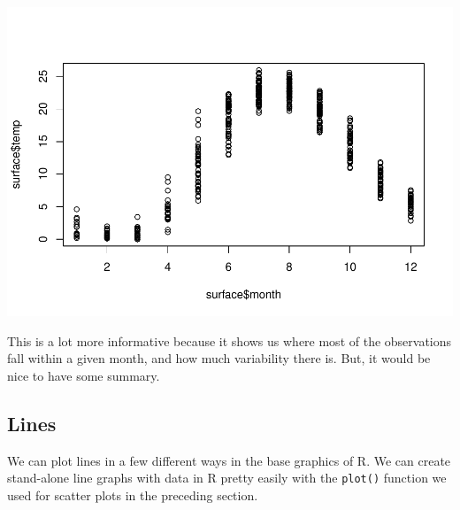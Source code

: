 \documentclass[
]{book}
\newenvironment{Shaded}{\begin{snugshade}}{\end{snugshade}}
\newcommand{\CommentTok}[1]{\textcolor[rgb]{0.56,0.35,0.01}{\textit{#1}}}
\newcommand{\DataTypeTok}[1]{\textcolor[rgb]{0.13,0.29,0.53}{#1}}
\newcommand{\DecValTok}[1]{\textcolor[rgb]{0.00,0.00,0.81}{#1}}
\newcommand{\FloatTok}[1]{\textcolor[rgb]{0.00,0.00,0.81}{#1}}
\newcommand{\KeywordTok}[1]{\textcolor[rgb]{0.13,0.29,0.53}{\textbf{#1}}}
\newcommand{\NormalTok}[1]{#1}
\newcommand{\OperatorTok}[1]{\textcolor[rgb]{0.81,0.36,0.00}{\textbf{#1}}}
\newcommand{\OtherTok}[1]{\textcolor[rgb]{0.56,0.35,0.01}{#1}}
\newcommand{\StringTok}[1]{\textcolor[rgb]{0.31,0.60,0.02}{#1}}
\begin{document}
\begin{Shaded}
\end{Shaded}

\includegraphics{worstr_files/figure-latex/unnamed-chunk-92-1.pdf}

This is a lot more informative because it shows us where most of the observations fall within a given month, and how much variability there is. But, it would be nice to have some summary.

\hypertarget{lines}{%
\subsection{Lines}\label{lines}}

We can plot lines in a few different ways in the base graphics of R. We can create stand-alone line graphs with data in R pretty easily with the \texttt{plot()} function we used for scatter plots in the preceding section.
\end{document}
